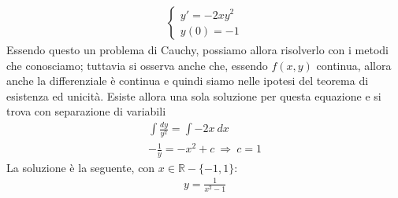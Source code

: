 \documentclass[a4paper, oneside]{book}
\begin{document}
\begin{example}
    \begin{gather*}
        \left\{\begin{array}{l}
            y' = -2xy^{2}  \\
            y(0) = -1
        \end{array}\right.
    \end{gather*}
    Essendo questo un problema di Cauchy, possiamo allora risolverlo
    con i metodi che conosciamo; tuttavia si osserva anche che, essendo
    $f(x, y)$ continua, allora anche la differenziale è continua e quindi
    siamo nelle ipotesi del teorema di esistenza ed unicità. Esiste allora
    una sola soluzione per questa equazione e si trova con
    separazione di variabili
    \begin{gather*}
        \int \frac{dy}{y^{2} } = \int -2x \ dx \\
        -\frac{1}{y} = -x^{2} + c \ \Longrightarrow \  c = 1 
    \end{gather*}
    La soluzione è la seguente, con $ x \in \mathbb{R} - \{-1, 1\}$: 
    \begin{gather*}
        y = \frac{1}{x^{2} - 1}
    \end{gather*}
\end{example}

\clearpage
\end{document}
